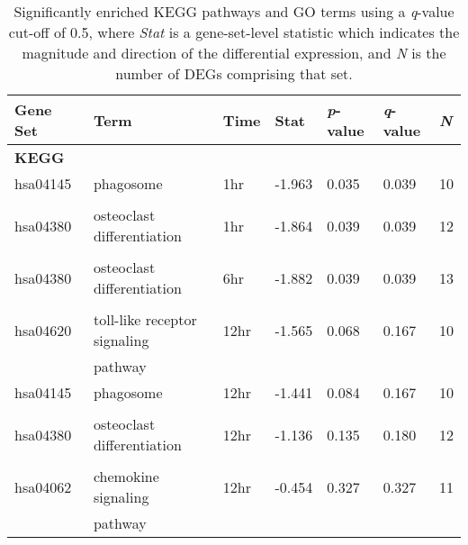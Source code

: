 \begin{table}[!ht]
\centering
\caption{Significantly enriched KEGG pathways and GO terms using a \textit{q}-value cut-off of 0.5, where \textit{Stat} is a gene-set-level statistic which indicates the magnitude and direction of the differential expression, and \textit{N} is the number of \ac{DEG}s comprising that set.}
\label{tab:gage}
\begin{tabular}{lllllll}
 \toprule
     \textbf{Gene Set} & \textbf{Term}                          & \textbf{Time} & \textbf{Stat}   & \textbf{\textit{p}-value} & \textbf{\textit{q}-value} & \textbf{\textit{N}}   \\ \midrule
            \textbf{KEGG}   \\ \midrule
hsa04145~ & phagosome                     & 1hr  & -1.963 & 0.035   & 0.039   & 10  \\
          &                               &      &        &         &         &     \\ \hline
hsa04380~ & osteoclast differentiation    & 1hr  & -1.864 & 0.039   & 0.039   & 12  \\
          &                               &      &        &         &         &     \\ \hline
hsa04380~ & osteoclast differentiation    & 6hr  & -1.882 & 0.039   & 0.039   & 13  \\
          &                               &      &        &         &         &     \\ \hline
hsa04620~ & toll-like receptor signaling~ & 12hr & -1.565 & 0.068   & 0.167   & 10  \\
          & pathway                       &      &        &         &         &     \\ \hline
hsa04145~ & phagosome                     & 12hr & -1.441 & 0.084   & 0.167   & 10  \\
          &                               &      &        &         &         &     \\ \hline
hsa04380~ & osteoclast differentiation    & 12hr & -1.136 & 0.135   & 0.180   & 12  \\
          &                               &      &        &         &         &     \\ \hline
hsa04062~ & chemokine signaling~          & 12hr & -0.454 & 0.327   & 0.327   & 11  \\
          & pathway                       &      &        &         &         &    \\ \midrule


\end{tabular}
\end{table}
